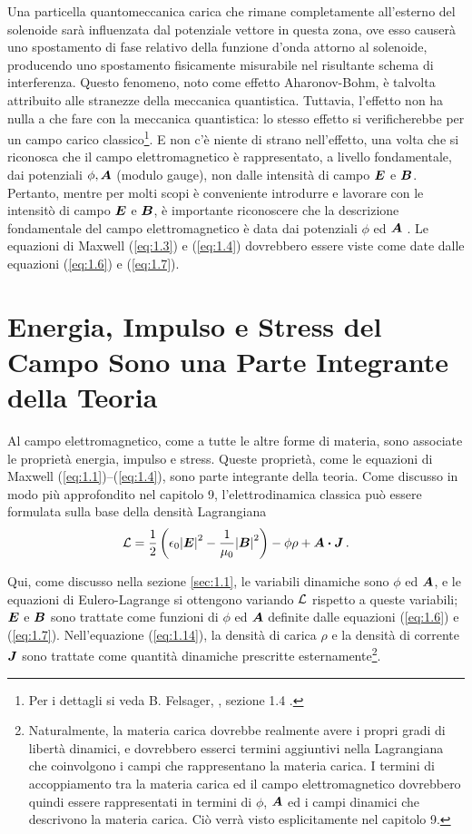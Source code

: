 Una particella quantomeccanica carica che rimane completamente all'esterno del solenoide sarà influenzata dal potenziale vettore in questa zona, ove esso causerà uno spostamento di fase relativo della funzione d'onda attorno al solenoide, producendo uno spostamento fisicamente misurabile nel risultante schema di interferenza. Questo fenomeno, noto come effetto Aharonov-Bohm, è talvolta attribuito alle stranezze della meccanica quantistica. Tuttavia, l'effetto non ha nulla a che fare con la meccanica quantistica: lo stesso effetto si verificherebbe per un campo carico classico\footnote{Per i dettagli si veda B. Felsager, , sezione 1.4 .}. 
E non c'è niente di strano nell'effetto, una volta che si riconosca che il campo elettromagnetico è rappresentato, a livello fondamentale, dai potenziali $\phi, \vb*{A}$ (modulo gauge), non dalle intensità di campo $\vb*{E}$ e $\vb*{B}$. Pertanto, mentre per molti scopi è conveniente introdurre e lavorare con le intensitò di campo $\vb*{E}$ e $\vb*{B}$, è importante riconoscere che la descrizione fondamentale del campo elettromagnetico è data dai potenziali $\phi$ ed $\vb*{A}$ . Le equazioni di Maxwell (\ref{eq:1.3}) e (\ref{eq:1.4}) dovrebbero essere viste come date dalle equazioni (\ref{eq:1.6}) e (\ref{eq:1.7}).


\section[Energia e Impulso del Campo]{Energia, Impulso e Stress del Campo Sono una Parte Integrante della Teoria}\label{sec:1.2}
Al campo elettromagnetico, come a tutte le altre forme di materia, sono associate le proprietà energia, impulso e stress. Queste proprietà, come le equazioni di Maxwell (\ref{eq:1.1})--(\ref{eq:1.4}), sono parte integrante della teoria. Come discusso in modo più approfondito nel capitolo 9, l'elettrodinamica classica può essere formulata sulla base della densità Lagrangiana  
\begin{equation}\label{eq:1.14}
\cL = \frac{1}{2} \left(\epsilon_0 {\abs{\vb*{E}}}^2 - \frac{1}{\mu_0} {\abs{\vb*{B}}}^2 \right) - \phi \rho + \vb*{A} \vdot \vb*{J}\,.
\end{equation}

Qui, come discusso nella sezione \ref{sec:1.1}, le variabili dinamiche sono $\phi$ ed $\vb*{A}$, e le equazioni di Eulero-Lagrange si ottengono variando $\mathcal{L}$ rispetto a queste variabili; $\vb*{E}$ e $\vb*{B}$ sono trattate come funzioni di $\phi$ ed $\vb*{A}$ definite dalle equazioni (\ref{eq:1.6}) e (\ref{eq:1.7}). Nell'equazione (\ref{eq:1.14}), la densità di carica $\rho$ e la densità di corrente $\vb*{J}$ sono trattate come quantità dinamiche prescritte 
esternamente\footnote{Naturalmente, la materia carica dovrebbe realmente avere i propri gradi di libertà dinamici, e dovrebbero esserci termini aggiuntivi nella Lagrangiana che coinvolgono i campi che rappresentano la materia carica. I termini di accoppiamento tra la materia carica ed il campo elettromagnetico dovrebbero quindi essere rappresentati in termini di $\phi$, $\vb*{A}$ ed i campi dinamici che descrivono la materia carica. Ciò verrà visto esplicitamente nel capitolo 9.}. 

